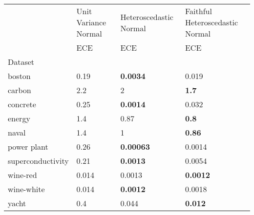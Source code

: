 \begin{tabular}{l|l|l|l}
\toprule
 & Unit Variance Normal & Heteroscedastic Normal & Faithful Heteroscedastic Normal \\
 & ECE & ECE & ECE \\
Dataset &  &  &  \\
\midrule
boston & 0.19 & \bfseries 0.0034 & 0.019 \\
carbon & 2.2 & 2 & \bfseries 1.7 \\
concrete & 0.25 & \bfseries 0.0014 & 0.032 \\
energy & 1.4 & 0.87 & \bfseries 0.8 \\
naval & 1.4 & 1 & \bfseries 0.86 \\
power plant & 0.26 & \bfseries 0.00063 & 0.0014 \\
superconductivity & 0.21 & \bfseries 0.0013 & 0.0054 \\
wine-red & 0.014 & 0.0013 & \bfseries 0.0012 \\
wine-white & 0.014 & \bfseries 0.0012 & 0.0018 \\
yacht & 0.4 & 0.044 & \bfseries 0.012 \\
\bottomrule
\end{tabular}
